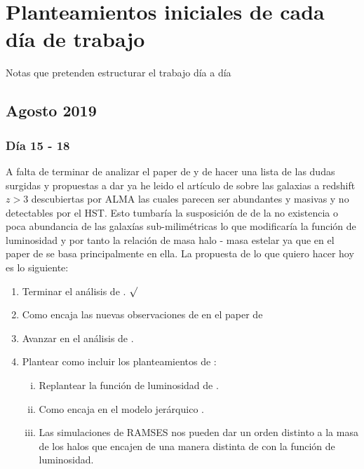 \section*{Planteamientos iniciales de cada día de trabajo}
Notas que pretenden estructurar el trabajo día a día
\subsection*{Agosto 2019}
\subsubsection*{Día 15 - 18}
A falta de terminar de analizar el paper de \cite{finkelstein2015increasing} y de hacer una lista de las dudas surgidas y propuestas a dar ya he leido el artículo de \cite{wang2019dominant} sobre las galaxias a redshift $z>3$ descubiertas por ALMA las cuales parecen ser abundantes y masivas y no detectables por el HST. Esto tumbaría la susposición de \cite{finkelstein2015increasing} de la no existencia o poca abundancia de las galaxías sub-milimétricas lo que modificaría la función de luminosidad y por tanto la relación de masa halo - masa estelar ya que en el paper de \cite{finkelstein2015increasing} se basa principalmente en ella. La propuesta de lo que quiero hacer hoy es lo siguiente:
\begin{enumerate}
\item Terminar el análisis de \cite{finkelstein2015increasing}. $\surd$
\item Como encaja las nuevas observaciones de \cite{wang2019dominant} en el paper de \cite{finkelstein2015increasing}
\item Avanzar en el análisis de \cite{steinhardt2016impossibly}.
\item Plantear como incluir los planteamientos de \cite{wang2019dominant}:
\begin{enumerate}[i.]
\item Replantear la función de luminosidad de \cite{finkelstein2015increasing}.
\item Como encaja en el modelo jerárquico \citep{bower2006breaking}.
\item Las simulaciones de RAMSES nos pueden dar un orden distinto a la masa de los halos que encajen de una manera distinta de con la función de luminosidad. 
\end{enumerate}
\end{enumerate}